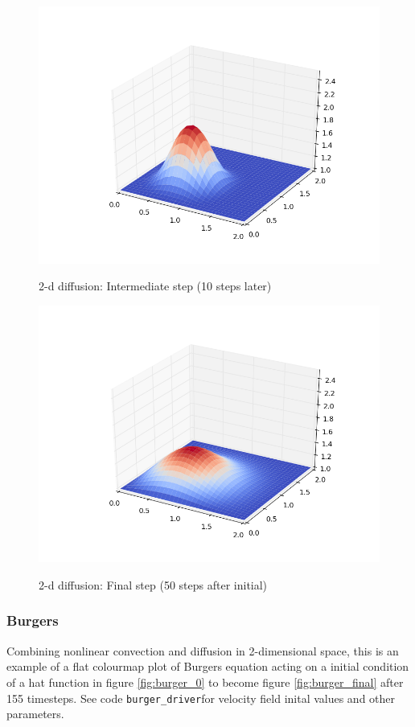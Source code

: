 \documentclass[11pt]{article}
\begin{document}
{	\begin{figure}[H]
	\centering
	\caption{2-d diffusion: Intermediate step (10 steps later)}
	\includegraphics[scale=0.8]{diff_1.png}
	\label{fig:diff_1}
	\end{figure}
	
	\begin{figure}[H]
	\centering
	\caption{2-d diffusion: Final step (50 steps after initial)}
	\includegraphics[scale=0.8]{diff_final.png}
	\label{fig:diff_final}
	\end{figure}

\subsubsection{Burgers}
Combining nonlinear convection and diffusion in 2-dimensional space, this is an example
of a flat colourmap plot of Burgers equation acting on a initial condition of a hat
function in figure \ref{fig:burger_0} to become figure \ref{fig:burger_final} after
155 timesteps. See code \texttt{burger\_driver}for velocity field inital values and other
parameters.

}
\end{document}
